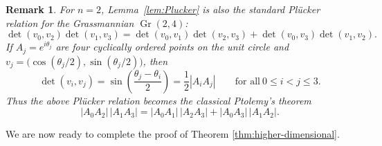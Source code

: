 \documentclass[11pt]{article}
\newtheorem{remark}[theorem]{Remark}
\begin{document}
\begin{remark}
For $n=2$, Lemma~\ref{lem:Plucker} is also the standard Pl\"ucker relation for the Grassmannian
\(\operatorname{Gr}(2,4)\):
\[
\det(v_0,v_2)\det(v_1,v_3)
=
\det(v_0,v_1)\det(v_2,v_3)
+
\det(v_0,v_3)\det(v_1,v_2).
\]
If \(A_j=e^{i\theta_j}\) are four cyclically ordered points on the unit circle and $v_j=\bigl(\cos(\theta_j/2),\sin(\theta_j/2)\bigr)$, then
\[
  \det(v_i,v_j)
  =
  \sin\left(\frac{\theta_j-\theta_i}{2}\right)
  =
  \frac12 |A_iA_j|
  \qquad \text{for all}\ 0 \leq i<j \leq 3.
\]
Thus the above Pl\"ucker relation becomes the classical Ptolemy's theorem
\[
  |A_0A_2|\,|A_1A_3|
  =
  |A_0A_1|\,|A_2A_3|
  +
  |A_0A_3|\,|A_1A_2|.
\]
\end{remark}

We are now ready to complete the proof of Theorem \ref{thm:higher-dimensional}.
\end{document}
